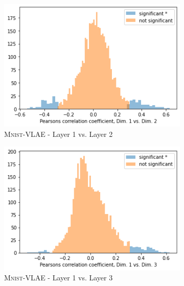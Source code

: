 \documentclass{beamer}
\begin{document}
\begin{frame}
\begin{figure}
\centering
\begin{subfigure}{.3\textwidth}
\includegraphics[width=\textwidth]{images/notprop/dsprites/vlae/dim_1_2.png}
\caption{\textsc{Mnist}-VLAE - Layer 1 vs. Layer 2}
\end{subfigure}
\hfill
\begin{subfigure}{.3\textwidth}
\includegraphics[width=\textwidth]{images/notprop/dsprites/vlae/dim_1_3.png}
\caption{\textsc{Mnist}-VLAE - Layer 1 vs. Layer 3}
\end{subfigure}
\hfill
\begin{subfigure}{.3\textwidth}

\end{subfigure}
\end{figure}
\end{frame}
\end{document}
